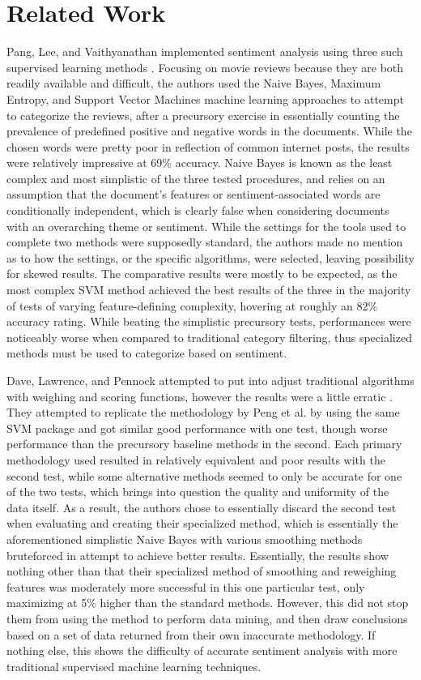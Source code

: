 \section{Related Work}
Pang, Lee, and Vaithyanathan implemented sentiment analysis using three such supervised learning methods \cite{Pang:2002:TUS:1118693.1118704}. Focusing on movie reviews because they are both readily available and difficult, the authors used the Naive Bayes, Maximum Entropy, and Support Vector Machines machine learning approaches to attempt to categorize the reviews, after a precursory exercise in essentially counting the prevalence of predefined positive and negative words in the documents. While the chosen words were pretty poor in reflection of common internet posts, the results were relatively impressive at 69\% accuracy. Naive Bayes is known as the least complex and most simplistic of the three tested procedures, and relies on an assumption that the document’s features or sentiment-associated words are conditionally independent, which is clearly false when considering documents with an overarching theme or sentiment. While the settings for the tools used to complete two methods were supposedly standard, the authors made no mention as to how the settings, or the specific algorithms, were selected, leaving possibility for skewed results. The comparative results were mostly to be expected, as the most complex SVM method achieved the best results of the three in the majority of tests of varying feature-defining complexity, hovering at roughly an 82\% accuracy rating. While beating the simplistic precursory tests, performances were noticeably worse when compared to traditional category filtering, thus specialized methods must be used to categorize based on sentiment.

Dave, Lawrence, and Pennock attempted to put into adjust traditional algorithms with weighing and scoring functions, however the results were a little erratic \cite{Dave:2003:MPG:775152.775226}. They attempted to replicate the methodology by Peng et al. by using the same SVM package and got similar good performance with one test, though worse performance than the precursory baseline methods in the second. Each primary methodology used resulted in relatively equivalent and poor results with the second test, while some alternative methods seemed to only be accurate for one of the two tests, which brings into question the quality and uniformity of the data itself. As a result, the authors chose to essentially discard the second test when evaluating and creating their specialized method, which is essentially the aforementioned simplistic Naive Bayes with various smoothing methods bruteforced in attempt to achieve better results. Essentially, the results show nothing other than that their specialized method of smoothing and reweighing features was moderately more successful in this one particular test, only maximizing at 5\% higher than the standard methods. However, this did not stop them from using the method to perform data mining, and then draw conclusions based on a set of data returned from their own inaccurate methodology. If nothing else, this shows the difficulty of accurate sentiment analysis with more traditional supervised machine learning techniques.

